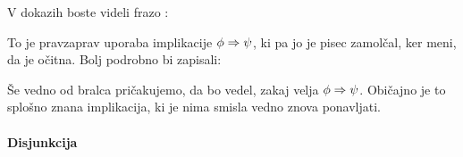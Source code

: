 V dokazih boste videli frazo :
%
\begin{boxDisplay}
  \begin{boxedProof}
    \begin{boxFrame}
    \end{boxFrame}
  \end{boxedProof}
\end{boxDisplay}
%
To je pravzaprav uporaba implikacije $\phi \Rightarrow \psi$, ki pa jo je pisec zamolčal, ker meni, da je očitna. Bolj podrobno bi zapisali:
%
\begin{boxDisplay}
  \begin{boxedProof}
    \begin{boxFrame}
    \end{boxFrame}
  \end{boxedProof}
\end{boxDisplay}
%
Še vedno od bralca pričakujemo, da bo vedel, zakaj velja $\phi \Rightarrow \psi$.
%
Običajno je to splošno znana implikacija, ki je nima smisla vedno znova ponavljati.


\paragraph*{Disjunkcija}
\label{sec:disjunkcija-pravila}

